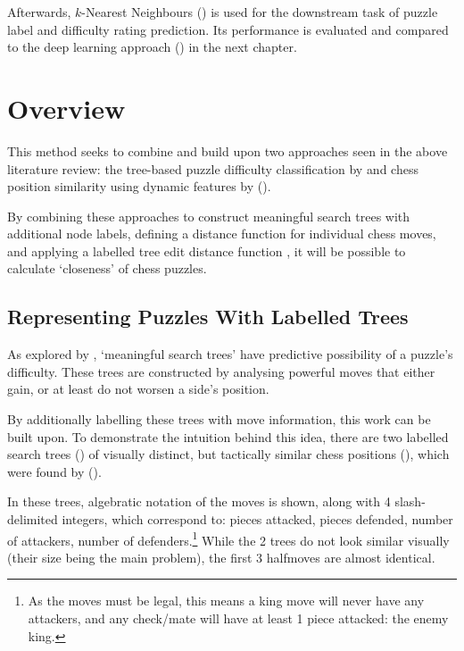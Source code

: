 Afterwards, $k$-Nearest Neighbours () is used for the downstream
task of puzzle label and difficulty rating prediction. Its performance is
evaluated and compared to the deep learning approach () in the
next chapter.

\section{Overview}\label{treeS1}

This method seeks to combine and build upon two approaches seen in the above
literature review: the tree-based puzzle difficulty classification by
\citet{chessTrees} and chess position similarity using dynamic features by
\citet{chessMotifs} ().

By combining these approaches to construct meaningful search trees with
additional node labels, defining a distance function for individual chess
moves, and applying a labelled tree edit distance function
\citep{editDistTrees}, it will be possible to calculate `closeness' of chess
puzzles. 

\subsection{Representing Puzzles With Labelled Trees}\label{treeS11}

As explored by \citet{chessTrees}, `meaningful search trees' have predictive
possibility of a puzzle's difficulty. These trees are constructed by analysing
powerful moves that either gain, or at least do not worsen a side's position. 

By additionally labelling these trees with move information, this work can be
built upon. To demonstrate the intuition behind this idea, there are two
labelled search trees () of visually distinct, but tactically
similar chess positions (), which were found by
\citet{chessLanguage} (). 

In these trees, algebratic notation of the moves is shown, along with 4
slash-delimited integers, which correspond to: pieces attacked, pieces
defended, number of attackers, number of defenders.\footnote{As the moves must
be legal, this means a king move will never have any attackers, and any
check/mate will have at least 1 piece attacked: the enemy king.} While the 2
trees do not look similar visually (their size being the main problem), the
first 3 halfmoves are almost identical. 

